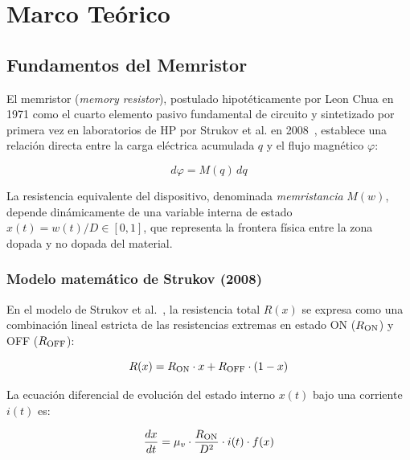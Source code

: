 
\chapter{Marco Teórico}
\label{ch:marco-teorico}

\section{Fundamentos del Memristor}
\label{sec:marco-memristor}

El memristor (\emph{memory resistor}), postulado hipotéticamente por Leon Chua en 1971 como el cuarto elemento pasivo fundamental de circuito y sintetizado por primera vez en laboratorios de HP por Strukov et al. en 2008~\cite{strukov2008}, establece una relación directa entre la carga eléctrica acumulada $q$ y el flujo magnético $\varphi$:

\begin{equation}
d\varphi = M(q) \, dq
\label{eq:memristor-fundamental}
\end{equation}

La resistencia equivalente del dispositivo, denominada \emph{memristancia} $M(w)$, depende dinámicamente de una variable interna de estado $x(t) = w(t)/D \in [0, 1]$, que representa la frontera física entre la zona dopada y no dopada del material.

\subsection{Modelo matemático de Strukov (2008)}
\label{subsec:marco-strukov}

En el modelo de Strukov et al.~\cite{strukov2008}, la resistencia total $R(x)$ se expresa como una combinación lineal estricta de las resistencias extremas en estado ON ($R_{\mathrm{ON}}$) y OFF ($R_{\mathrm{OFF}}$):

\begin{equation}
R(x) = R_{\mathrm{ON}} \cdot x + R_{\mathrm{OFF}} \cdot (1 - x)
\label{eq:strukov-rx}
\end{equation}

La ecuación diferencial de evolución del estado interno $x(t)$ bajo una corriente $i(t)$ es:

\begin{equation}
\frac{dx}{dt} = \mu_v \cdot \frac{R_{\mathrm{ON}}}{D^2} \cdot i(t) \cdot f(x)
\label{eq:strukov-dxdt}
\end{equation}

